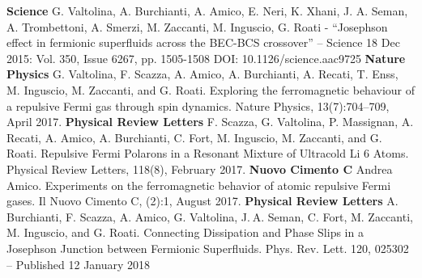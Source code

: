 \begin{cvhonors}
  \cventry
    {}
    {}
    {}
    {\textbf{Science}}
    {G. Valtolina, A. Burchianti, A. Amico, E. Neri, K. Xhani, J. A. Seman, A. Trombettoni, A. Smerzi, M. Zaccanti, M. Inguscio, G. Roati - “Josephson effect in fermionic superfluids across the BEC-BCS crossover” – Science  18 Dec 2015: Vol. 350, Issue 6267, pp. 1505-1508 DOI: 10.1126/science.aac9725}
  \cventry
    {}
    {}
    {}
    {\textbf{Nature Physics}}
    {G. Valtolina, F. Scazza, A. Amico, A. Burchianti, A. Recati, T. Enss, M. Inguscio, M. Zaccanti, and G. Roati. Exploring the ferromagnetic behaviour of a repulsive Fermi gas through spin dynamics. Nature Physics, 13(7):704–709, April 2017.}
  \cventry
    {}
    {}
    {}
    {\textbf{Physical Review Letters}}
    {F. Scazza, G. Valtolina, P. Massignan, A. Recati, A. Amico, A. Burchianti, C. Fort, M. Inguscio,  M. Zaccanti, and G. Roati. Repulsive Fermi Polarons in a Resonant Mixture of Ultracold Li 6 Atoms. Physical Review Letters, 118(8), February 2017.}
  \cventry
    {}
    {}
    {}
    {\textbf{Nuovo Cimento C}}
    {Andrea Amico. Experiments on the ferromagnetic behavior of atomic repulsive Fermi gases. Il Nuovo Cimento C, (2):1, August 2017.}
  \cventry
    {}
    {}
    {}
    {\textbf{Physical Review Letters}}
    {A. Burchianti, F. Scazza, A. Amico, G. Valtolina, J. A. Seman, C. Fort, M. Zaccanti, M. Inguscio, and G. Roati. Connecting Dissipation and Phase Slips in a Josephson Junction between Fermionic Superfluids.
Phys. Rev. Lett. 120, 025302 – Published 12 January 2018}
\end{cvhonors}















